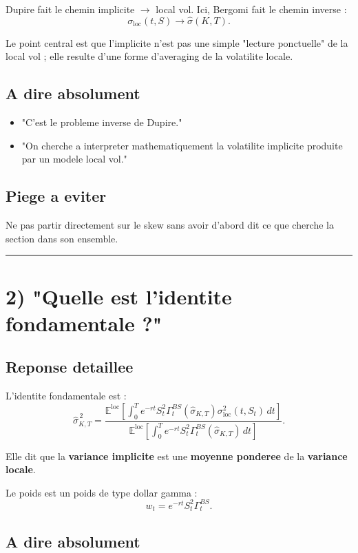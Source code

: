 \documentclass[11pt,a4paper]{article}
\begin{document}
Dupire fait le chemin implicite \(\to\) local vol.  
Ici, Bergomi fait le chemin inverse :
\[
\sigma_{\mathrm{loc}}(t,S)\longrightarrow \hat{\sigma}(K,T).
\]

Le point central est que l'implicite n'est pas une simple "lecture ponctuelle" de la local vol ; elle resulte d'une forme d'averaging de la volatilite locale.

\subsection{A dire absolument}

\begin{itemize}
\item "C'est le probleme inverse de Dupire."
\item "On cherche a interpreter mathematiquement la volatilite implicite produite par un modele local vol."
\end{itemize}

\subsection{Piege a eviter}

Ne pas partir directement sur le skew sans avoir d'abord dit ce que cherche la section dans son ensemble.

\bigskip\hrule\bigskip

\section{2) "Quelle est l'identite fondamentale ?"}

\subsection{Reponse detaillee}

L'identite fondamentale est :
\[
\hat{\sigma}_{K,T}^{\,2}
=
\frac{
\mathbb E^{\mathrm{loc}}
\!\left[
\int_0^T e^{-rt}S_t^2\Gamma_t^{BS}(\hat{\sigma}_{K,T})
\sigma_{\mathrm{loc}}^2(t,S_t)\,dt
\right]
}{
\mathbb E^{\mathrm{loc}}
\!\left[
\int_0^T e^{-rt}S_t^2\Gamma_t^{BS}(\hat{\sigma}_{K,T})\,dt
\right]
}.
\]

Elle dit que la \textbf{variance implicite} est une \textbf{moyenne ponderee} de la \textbf{variance locale}.

Le poids est un poids de type dollar gamma :
\[
w_t=e^{-rt}S_t^2\Gamma_t^{BS}.
\]

\subsection{A dire absolument}
\end{document}
